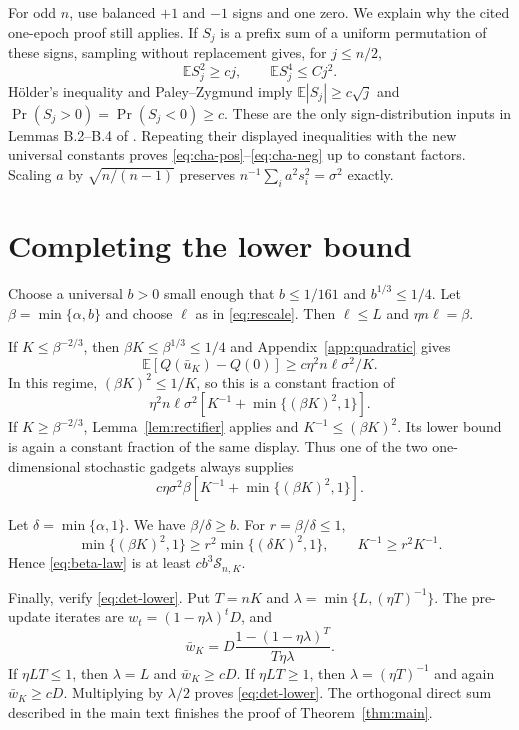 \documentclass{article}
\theoremstyle{remark}
\newcommand{\E}{\mathbb E}
\newcommand{\Stoch}{\mathcal S}
\newcommand{\1}{\mathbf 1}
\begin{document}
For odd $n$, use balanced $+1$ and $-1$ signs and one zero. We explain why the cited one-epoch proof still applies. If $S_j$ is a prefix sum of a uniform permutation of these signs, sampling without replacement gives, for $j\leq n/2$, \[ \E S_j^2\geq c j, \qquad \E S_j^4\leq Cj^2. \] H\"older's inequality and Paley--Zygmund imply $\E|S_j|\geq c\sqrt j$ and $\Pr(S_j>0)=\Pr(S_j<0)\geq c$. These are the only sign-distribution inputs in Lemmas B.2--B.4 of \citet{cha2023tighter}. Repeating their displayed inequalities with the new universal constants proves \eqref{eq:cha-pos}--\eqref{eq:cha-neg} up to constant factors. Scaling $a$ by $\sqrt{n/(n-1)}$ preserves $n^{-1}\sum_i a^2s_i^2=\sigma^2$ exactly.

\section{Completing the lower bound}\label{app:lower}

Choose a universal $b>0$ small enough that $b\leq1/161$ and $b^{1/3}\leq1/4$. Let $\beta=\min\{\alpha,b\}$ and choose $\ell$ as in \eqref{eq:rescale}. Then $\ell\leq L$ and $\eta n\ell=\beta$.

If $K\leq\beta^{-2/3}$, then $\beta K\leq\beta^{1/3}\leq1/4$ and Appendix~\ref{app:quadratic} gives \[ \E[Q(\bar u_K)-Q(0)] \geq c\eta^2n\ell\sigma^2/K. \] In this regime, $(\beta K)^2\leq1/K$, so this is a constant fraction of \[ \eta^2n\ell\sigma^2 \left[K^{-1}+\min\{(\beta K)^2,1\}\right]. \] If $K\geq\beta^{-2/3}$, Lemma~\ref{lem:rectifier} applies and $K^{-1}\leq(\beta K)^2$. Its lower bound is again a constant fraction of the same display. Thus one of the two one-dimensional stochastic gadgets always supplies
\begin{equation}
 c\eta\sigma^2\beta
 \left[K^{-1}+\min\{(\beta K)^2,1\}\right].           \label{eq:beta-law}
\end{equation}

Let $\delta=\min\{\alpha,1\}$. We have $\beta/\delta\geq b$. For $r=\beta/\delta\leq1$, \[ \min\{(\beta K)^2,1\} \geq r^2\min\{(\delta K)^2,1\}, \qquad K^{-1}\geq r^2K^{-1}. \] Hence \eqref{eq:beta-law} is at least $cb^3\Stoch_{n,K}$.

Finally, verify \eqref{eq:det-lower}. Put $T=nK$ and $\lambda=\min\{L,(\eta T)^{-1}\}$. The pre-update iterates are $w_t=(1-\eta\lambda)^tD$, and \[ \bar w_K =D\frac{1-(1-\eta\lambda)^T}{T\eta\lambda}. \] If $\eta LT\leq1$, then $\lambda=L$ and $\bar w_K\geq cD$. If $\eta LT\geq1$, then $\lambda=(\eta T)^{-1}$ and again $\bar w_K\geq cD$. Multiplying by $\lambda/2$ proves \eqref{eq:det-lower}. The orthogonal direct sum described in the main text finishes the proof of Theorem~\ref{thm:main}.
\end{document}
